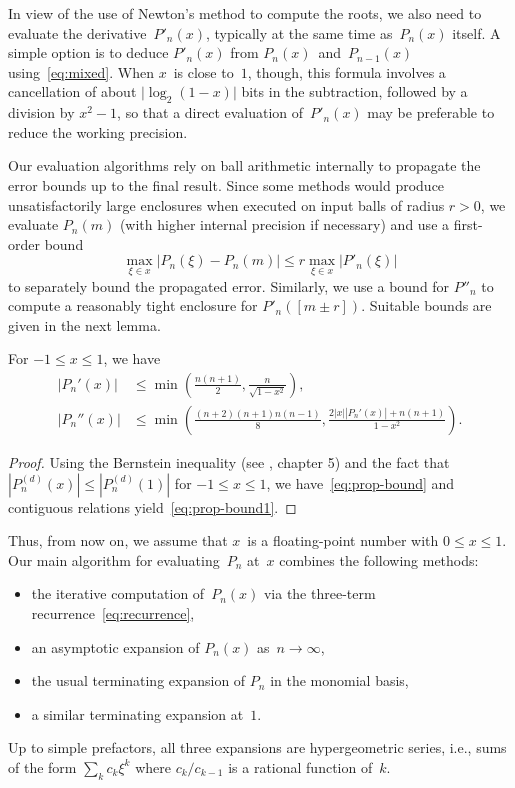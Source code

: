 \documentclass{siamart0216}
\newcommand{\abs}[1]{\mathopen| #1 \mathclose|}
\begin{document}
In view of the use of Newton's method to compute the roots,
we also need to evaluate the derivative $P'_n(x)$,
typically at the same time as $P_n(x)$ itself.
A simple option is to deduce $P'_n(x)$ from
$P_n(x)$ and $P_{n-1}(x)$ using \eqref{eq:mixed}.
When $x$ is close to~$1$, though, this formula involves a
cancellation of about $\abs{\log_2(1 - x)}$ bits in the subtraction,
followed by a division by $x^2 - 1$, so that a direct evaluation
of $P'_n(x)$ may be preferable to reduce the working precision.

Our evaluation algorithms rely on ball arithmetic internally to
propagate the error bounds up to the final result.
Since some methods would produce unsatisfactorily large enclosures
when executed on input balls of radius $r > 0$, we evaluate $P_n(m)$
(with higher internal precision if necessary) and use a first-order
bound
\[ \max_{\xi \in x} |P_n(\xi) - P_n(m)|
   \le r \max_{\xi \in x} |P'_n(\xi)| \]
to separately bound the propagated error.
Similarly, we use a bound for $P''_n$ to compute a reasonably
tight enclosure for $P'_n([m \pm r])$.
Suitable bounds are given in the next lemma.

\begin{lemma} \label{lemma:prop-bound}
For $-1 \leq x \leq 1$, we have
\begin{align}
\label{eq:prop-bound}
  |P_n'(x)| &\le \min\left(\frac{n(n+1)}{2},
                          \frac{n}{\sqrt{1-x^2}}\right), \\
\label{eq:prop-bound1}
  |P_n''(x)| &\le \min\left(\frac{(n+2)(n+1)n(n-1)}{8},
                           \frac{2|x||P_n'(x)| + n(n+1)}{1-x^2}\right).
\end{align}
\end{lemma}

\begin{proof}

Using the Bernstein inequality (see \cite{borwein2012polynomials}, chapter 5)
and the fact that $|P^{(d)}_n(x)| \le |P^{(d)}_n(1)|$ for $-1 \le x \le 1$,
we have~\eqref{eq:prop-bound}
and contiguous relations yield~\eqref{eq:prop-bound1}.
\end{proof}

Thus, from now on, we assume that $x$~is a floating-point number with
$0 \leq x \leq 1$.
Our main algorithm for evaluating~$P_n$ at~$x$ combines the following
methods:
\begin{itemize}
  \item the iterative computation of~$P_n(x)$
  via the three-term recurrence~\eqref{eq:recurrence},
  \item an asymptotic expansion of $P_n(x)$ as~$n \to \infty$,
  \item the usual terminating expansion of $P_n$ in the monomial
  basis,
  \item a similar terminating expansion at~$1$.
\end{itemize}
Up to simple prefactors, all three expansions are hypergeometric
series, i.e., sums of the form $\sum_k c_k \xi^k$ where $c_k/c_{k-1}$
is a rational function of~$k$.
\end{document}
